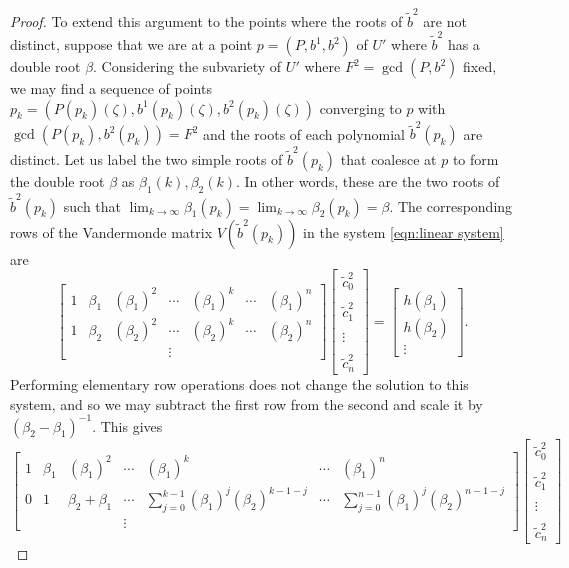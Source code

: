 \begin{lem}
\begin{proof}
To extend this argument to the points where the roots of $\tilde{b}^2$ are not distinct, suppose that we are at a point $p = (P,b^1,b^2)$ of $U'$ where $\tilde{b}^2$ has a double root $β$. Considering the subvariety of $U'$ where $F^2 = \gcd(P,b^2)$ fixed, we may find a sequence of points $p_k = (P(p_k)(ζ), b^1(p_k)(ζ), b^2(p_k)(ζ))$ converging to $p$ with $\gcd(P(p_k),b^2(p_k)) = F^2$ and the roots of each polynomial $\tilde{b}^2(p_k)$ are distinct. Let us label the two simple roots of $\tilde{b}^2(p_k)$ that coalesce at $p$ to form the double root $β$ as  $β_1(k),β_2(k)$.
In other words, these are the two roots of $\tilde{b}^2(p_k)$ such that $\lim_{k\to\infty} β_1(p_k) = \lim_{k\to\infty} β_2(p_k) = β$. The corresponding rows of the Vandermonde matrix $V(\tilde{b}^2(p_k))$ in the system \eqref{eqn:linear system} are
\[
\begin{bmatrix}
1 & β_1 & (β_1)^2 & \cdots & (β_1)^{k} & \cdots & (β_1)^{n} \\
1 & β_2 & (β_2)^2 & \cdots & (β_2)^{k} & \cdots & (β_2)^{n} \\
&&&\vdots&&&
\end{bmatrix}
\begin{bmatrix}
\tilde{c}^2_0 \\~\\ \tilde{c}^2_1 \\~\\ \vdots \\~\\ \tilde{c}^2_n
\end{bmatrix}
=
\begin{bmatrix}
h(β_1) \\
h(β_2) \\
\vdots
\end{bmatrix}.
\]
Performing elementary row operations does not change the solution to this system, and so we may subtract the first row from the second and scale it by $(β_2-β_1)^{-1}$. This gives
\[
\begin{bmatrix}
1 & β_1 & (β_1)^2 & \cdots & (β_1)^{k} & \cdots & (β_1)^{n} \\
0 & 1 & β_2+β_1 & \cdots & \sum_{j=0}^{k-1}(β_1)^j(β_2)^{k-1-j} & \cdots & \sum_{j=0}^{n-1}(β_1)^j(β_2)^{n-1-j} \\
&&&\vdots&&&
\end{bmatrix}
\begin{bmatrix}
\tilde{c}^2_0 \\~\\ \tilde{c}^2_1 \\~\\ \vdots \\~\\ \tilde{c}^2_n

\end{bmatrix}\]
\end{proof}
\end{lem}
